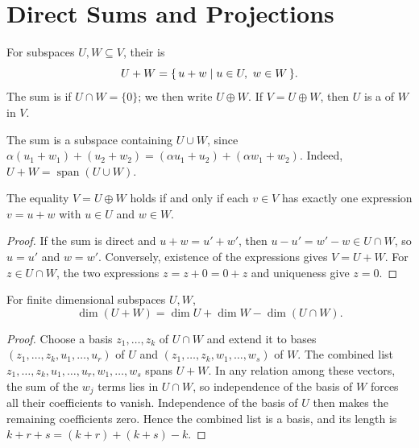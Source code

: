 
\section{Direct Sums and Projections}\label{sec:DirectSums}

\begin{Definition}
For subspaces $U,W\subseteq V$, their  is
\begin{equation*}
U+W=\qty{\, u+w \mid u\in U,\ w\in W \,}.
\end{equation*}
The sum is  if $U\cap W=\{0\}$; we then write $U\oplus W$. If $V=U\oplus W$, then $U$ is a  of $W$ in $V$.
\end{Definition}

The sum is a subspace containing $U\cup W$, since $\alpha(u_1+w_1)+(u_2+w_2)=(\alpha u_1+u_2)+(\alpha w_1+w_2)$. Indeed, $U+W=\operatorname{span}(U\cup W)$.

\begin{Theorem}\label{thm:DirectUnique}
The equality $V=U\oplus W$ holds if and only if each $v\in V$ has exactly one expression $v=u+w$ with $u\in U$ and $w\in W$.
\end{Theorem}
\begin{proof}
If the sum is direct and $u+w=u'+w'$, then $u-u'=w'-w\in U\cap W$, so $u=u'$ and $w=w'$. Conversely, existence of the expressions gives $V=U+W$. For $z\in U\cap W$, the two expressions $z=z+0=0+z$ and uniqueness give $z=0$.
\end{proof}

\begin{Theorem}\label{thm:DimensionSum}
For finite dimensional subspaces $U,W$,
\begin{equation*}
\dim(U+W)=\dim U+\dim W-\dim(U\cap W).
\end{equation*}
\end{Theorem}
\begin{proof}
Choose a basis $z_1,\ldots,z_k$ of $U\cap W$ and extend it to bases $(z_1,\ldots,z_k,u_1,\ldots,u_r)$ of $U$ and $(z_1,\ldots,z_k,w_1,\ldots,w_s)$ of $W$. The combined list $z_1,\ldots,z_k,u_1,\ldots,u_r,w_1,\ldots,w_s$ spans $U+W$. In any relation among these vectors, the sum of the $w_j$ terms lies in $U\cap W$, so independence of the basis of $W$ forces all their coefficients to vanish. Independence of the basis of $U$ then makes the remaining coefficients zero. Hence the combined list is a basis, and its length is $k+r+s=(k+r)+(k+s)-k$.
\end{proof}

